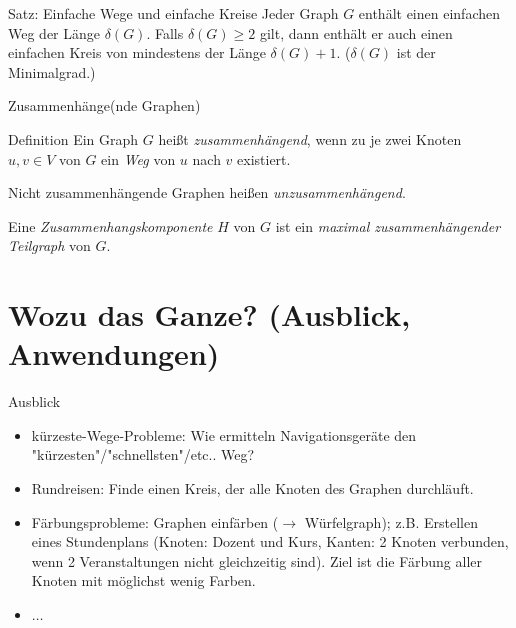 \documentclass{beamer}
\begin{document}
\begin{frame}
	\begin{exampleblock}{Satz: Einfache Wege und einfache Kreise}
		Jeder Graph $G$ enthält einen einfachen Weg der Länge $\delta(G)$. Falls $\delta(G) \geq 2$ gilt, dann enthält er auch einen einfachen Kreis von mindestens der Länge $\delta(G) + 1$. ($\delta(G)$ ist der Minimalgrad.)
	\end{exampleblock}

\end{frame}

\begin{frame}{Zusammenhänge(nde Graphen)}
	\begin{block}{Definition}
		Ein Graph $G$ heißt \emph{zusammenhängend}, wenn zu je zwei Knoten $u, v \in V$ von $G$ ein \emph{Weg} von $u$ nach $v$ existiert.
		\par\bigskip
    Nicht zusammenhängende Graphen heißen \emph{unzusammenhängend}.
		\par\bigskip
    Eine \emph{Zusammenhangskomponente} $H$ von $G$ ist ein \emph{maximal zusammenhängender Teilgraph} von $G$. 
	\end{block}
\end{frame}

\section[Wozu das Ganze?]{Wozu das Ganze? (Ausblick, Anwendungen)}
\begin{frame}{Ausblick}
    \begin{itemize}
        \item kürzeste-Wege-Probleme: Wie ermitteln Navigationsgeräte den "kürzesten"/"schnellsten"/etc.. Weg?
        \item Rundreisen: Finde einen Kreis, der alle Knoten des Graphen durchläuft.
        \item Färbungsprobleme: Graphen einfärben ($\rightarrow$ Würfelgraph); z.B. Erstellen eines Stundenplans (Knoten: Dozent und Kurs, Kanten: 2 Knoten verbunden, wenn 2 Veranstaltungen nicht gleichzeitig sind). Ziel ist die Färbung aller Knoten mit möglichst wenig Farben.
        \item $\ldots$
    \end{itemize}
    
\end{frame}

\end{document}
